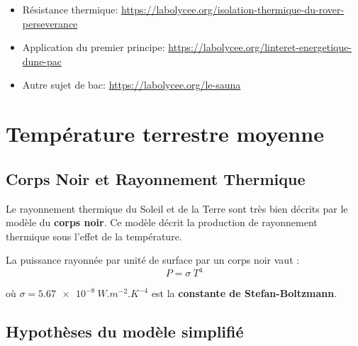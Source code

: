 
\begin{travail}
\begin{itemize}
	\item Résistance thermique: \url{https://labolycee.org/isolation-thermique-du-rover-perseverance}
	\item Application du premier principe: \url{https://labolycee.org/linteret-energetique-dune-pac}
	\item Autre sujet de bac: \url{https://labolycee.org/le-sauna}
\end{itemize}

\end{travail}


\section{Température terrestre moyenne}

\subsection{Corps Noir et Rayonnement Thermique}

Le rayonnement thermique du Soleil et de la Terre sont très bien décrits par le modèle du \textbf{corps noir}. Ce modèle décrit la production de rayonnement thermique sous l'effet de la température.

 La puissance rayonnée par unité de surface par un corps noir vaut :
$$\boxed{P=\sigma\ T^4}$$

où $\sigma = \SI{5,67e-8}{W.m^{-2}.K^{-4}}$ est la \textbf{constante de Stefan-Boltzmann}.

\subsection{Hypothèses du modèle simplifié}

